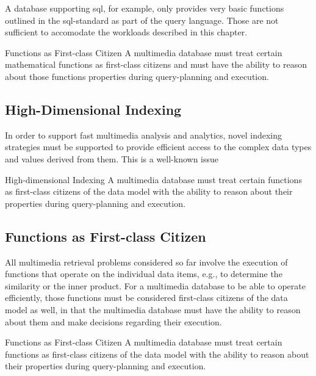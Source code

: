 A database supporting \acrshort{sql}, for example, only provides very basic functions outlined in the \acrshort{sql}-standard \cite{XOpen:1996SQL} as part of the query language. Those are not sufficient to accomodate the workloads described in this chapter. 

\begin{requirement}{Functions as First-class Citizen}{}
    A multimedia database must treat certain mathematical functions as first-class citizens and must have the ability to reason about those functions properties during query-planning and execution.
\end{requirement}

\subsection{High-Dimensional Indexing}

In order to support fast multimedia analysis and analytics, novel indexing strategies must be supported to provide efficient access to the complex data types and values derived from them. This is a well-known issue 

\begin{requirement}{High-dimensional Indexing}{}
    A multimedia database must treat certain functions as first-class citizens of the data model with the ability to reason about their properties during query-planning and execution.
\end{requirement}

\subsection{Functions as First-class Citizen}

All multimedia retrieval problems considered so far involve the execution of functions that operate on the individual data items, e.g., to determine the similarity or the inner product. For a multimedia database to be able to operate efficiently, those functions must be considered first-class citizens of the data model as well, in that the multimedia database must have the ability to reason about them and make decisions regarding their execution.

\begin{requirement}{Functions as First-class Citizen}{}
    A multimedia database must treat certain functions as first-class citizens of the data model with the ability to reason about their properties during query-planning and execution.
\end{requirement}